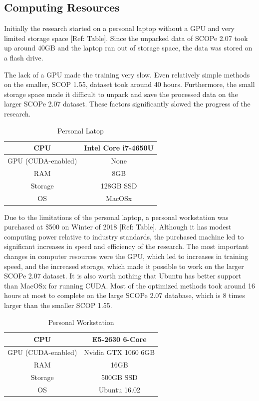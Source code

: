 \documentclass[12pt, a4paper, twocolumn, fullpage]{article}
\theoremstyle{plain}
\theoremstyle{definition}
\theoremstyle{remark}
\begin{document}
\subsection{Computing Resources}

Initially the research started on a personal laptop without a GPU and very limited storage space [Ref: Table]. Since the unpacked data of SCOPe 2.07 took up around 40GB and the laptop ran out of storage space, the data was stored on a flash drive. 

The lack of a GPU made the training very slow. Even relatively simple methods on the smaller, SCOP 1.55, dataset took around 40 hours. Furthermore, the small storage space made it difficult to unpack and save the processed data on the larger SCOPe 2.07 dataset. These factors significantly slowed the progress of the research.


\begin{table}[t]
	\centering
	\begin{tabular}{c | c}
		CPU & Intel Core i7-4650U \\ \hline
		GPU (CUDA-enabled) & None     \\ \hline
		RAM & 8GB    \\ \hline
		Storage & 128GB SSD \\ \hline
		OS & MacOSx  
	\end{tabular}
	\caption{Personal Latop}
	\label{tbl:Computer 1}
\end{table}

Due to the limitations of the personal laptop, a personal workstation was purchased at \$500 on Winter of 2018 [Ref: Table]. Although it has modest computing power relative to industry standards, the purchased machine led to significant increases in speed and efficiency of the research. The most important changes in computer resources were the GPU, which led to increases in training speed, and the increased storage, which made it possible to work on the larger SCOPe 2.07 dataset. It is also worth nothing that Ubuntu has better support than MacOSx for running CUDA.
Most of the optimized methods took around 16 hours at most to complete on the large SCOPe 2.07 database, which is 8 times larger than the smaller SCOP 1.55. 

\begin{table}[t]
	\centering
	\begin{tabular}{c | c}
		CPU & E5-2630 6-Core \\ \hline
		GPU (CUDA-enabled) & Nvidia GTX 1060 6GB     \\ \hline
		RAM & 16GB    \\ \hline
		Storage & 500GB SSD \\ \hline
		OS & Ubuntu 16.02  
	\end{tabular}
	\caption{Personal Workstation}
	\label{tbl:Computer 2}
\end{table}
\end{document}

